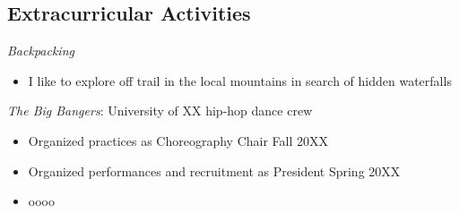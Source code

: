 \documentclass[resmargin, 10pt]{res} %
\begin{document}
\begin{resume}
	\section{Extracurricular Activities}
	 {\sl Backpacking}
	\vspace{1mm}
	\begin{itemize} \itemsep -2pt
		\item I like to explore off trail in the local mountains in search of hidden waterfalls
	\end{itemize}

	{\sl The Big Bangers}: University of XX hip-hop dance crew
	\vspace{1mm}
	\begin{itemize} \itemsep -2pt
		\item Organized practices as Choreography Chair \hfill Fall 20XX
		\item Organized performances and recruitment as President \hfill Spring 20XX
		\item oooo
	\end{itemize}


\end{resume}
\end{document}
